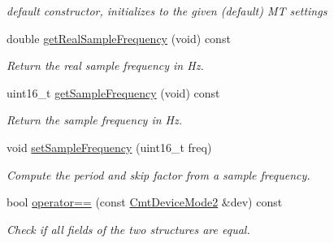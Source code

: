 \begin{DoxyCompactItemize}
\begin{DoxyCompactList}\small\item\em default constructor, initializes to the given (default) \-M\-T settings \end{DoxyCompactList}\item 
double \hyperlink{structCmtDeviceMode2_ad5f903492deefd00ae024837a696c41e}{get\-Real\-Sample\-Frequency} (void) const 
\begin{DoxyCompactList}\small\item\em \-Return the real sample frequency in \-Hz. \end{DoxyCompactList}\item 
uint16\-\_\-t \hyperlink{structCmtDeviceMode2_a3383bd1f6a410cef49e9f2e55a9b7969}{get\-Sample\-Frequency} (void) const 
\begin{DoxyCompactList}\small\item\em \-Return the sample frequency in \-Hz. \end{DoxyCompactList}\item 
void \hyperlink{structCmtDeviceMode2_af5f10b495e53605c9b6023f62cd938af}{set\-Sample\-Frequency} (uint16\-\_\-t freq)
\begin{DoxyCompactList}\small\item\em \-Compute the period and skip factor from a sample frequency. \end{DoxyCompactList}\item 
\hypertarget{structCmtDeviceMode2_a785c18bee9ac1f3f0278da66b44989c2}{bool \hyperlink{structCmtDeviceMode2_a785c18bee9ac1f3f0278da66b44989c2}{operator==} (const \hyperlink{structCmtDeviceMode2}{\-Cmt\-Device\-Mode2} \&dev) const }\label{structCmtDeviceMode2_a785c18bee9ac1f3f0278da66b44989c2}

\begin{DoxyCompactList}\small\item\em \-Check if all fields of the two structures are equal. \end{DoxyCompactList}\end{DoxyCompactItemize}
